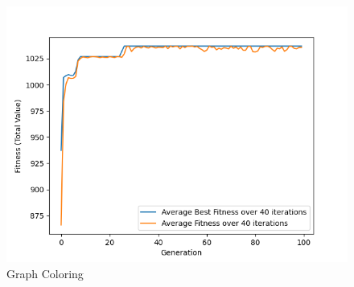 \documentclass[11pt, letterpaper]{article}
\begin{document}
\begin{figure}[H]
  \includegraphics[width=\linewidth]{images/knapsack_fp_tr.png}
  \caption{Graph Coloring}
\endminipage
\end{figure}
\end{document}
